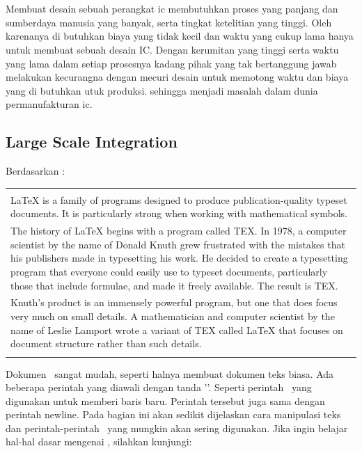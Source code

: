 \chapter{\babDua}
Membuat desain sebuah perangkat ic membutuhkan proses yang panjang dan sumberdaya manusia yang banyak, serta tingkat ketelitian yang tinggi. Oleh karenanya di butuhkan biaya yang tidak kecil dan waktu yang cukup lama hanya untuk membuat sebuah desain IC. Dengan kerumitan yang tinggi serta waktu yang lama dalam setiap prosesnya kadang pihak yang tak bertanggung jawab melakukan kecurangna dengan mecuri desain untuk memotong waktu dan biaya yang di butuhkan utuk produksi. sehingga menjadi masalah dalam dunia permanufakturan ic.

\section{Large Scale Integration}
Berdasarkan \cite{latex.intro}: \\ 
\begin{tabular}{| p{13cm} |}
	\hline 
	\\
	LaTeX is a family of programs designed to produce publication-quality typeset documents. It is particularly strong when working with mathematical symbols. \\	
	The history of LaTeX begins with a program called TEX. In 1978, a 
	computer scientist by the name of Donald Knuth grew frustrated with the mistakes that his publishers made in typesetting his work. He decided to create a typesetting program that everyone could easily use to typeset documents, particularly those that include formulae, and made it freely available. The result is TEX. \\	
	Knuth's product is an immensely powerful program, but one that does focus very much on small details. A mathematician and computer scientist by the name of Leslie Lamport wrote a variant of TEX called LaTeX that focuses on document structure rather than such details. \\
	\\
	\hline
\end{tabular}

\vspace*{0.8cm}

Dokumen \latex~sangat mudah, seperti halnya membuat dokumen teks biasa. Ada beberapa perintah yang diawali dengan tanda '\bslash'. 
Seperti perintah \bslash\bslash~yang digunakan untuk memberi baris baru. Perintah tersebut juga sama dengan perintah \bslash newline. 
Pada bagian ini akan sedikit dijelaskan cara manipulasi teks dan  perintah-perintah \latex~yang mungkin akan sering digunakan. Jika ingin belajar hal-hal dasar mengenai \latex, silahkan kunjungi:

